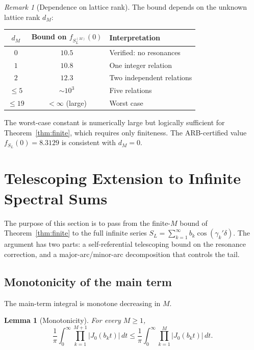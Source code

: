 \documentclass[12pt,reqno]{amsart}
\theoremstyle{plain}
\newtheorem{lemma}[theorem]{Lemma}
\theoremstyle{definition}
\theoremstyle{remark}
\newtheorem{remark}[theorem]{Remark}
\begin{document}
\begin{remark}[Dependence on lattice rank]\label{rem:rank}
The bound depends on the unknown lattice rank $d_M$:
\begin{center}
\renewcommand{\arraystretch}{1.1}
\begin{tabular}{ccl}
\toprule
$d_M$ & Bound on $f_{S_L^{(M)}}(0)$ & Interpretation \\
\midrule
$0$ & $10.5$ & Verified: no resonances \\
$1$ & $10.8$ & One integer relation \\
$2$ & $12.3$ & Two independent relations \\
$\leq 5$ & $\sim 10^3$ & Five relations \\
$\leq 19$ & $< \infty$ (large) & Worst case \\
\bottomrule
\end{tabular}
\end{center}
The worst-case constant is numerically large but logically sufficient for Theorem~\ref{thm:finite}, which requires only finiteness.  The ARB-certified value $f_{S_L}(0) = 8.3129$ is consistent with $d_M = 0$.
\end{remark}

\section{Telescoping Extension to Infinite Spectral Sums}\label{sec:infinite}

The purpose of this section is to pass from the finite-$M$ bound of Theorem~\ref{thm:finite} to the full infinite series $S_L = \sum_{k=1}^\infty b_k\cos(\gamma_k'\delta)$.  The argument has two parts: a self-referential telescoping bound on the resonance correction, and a major-arc/minor-arc decomposition that controls the tail.


\subsection{Monotonicity of the main term}

The main-term integral is monotone decreasing in $M$.

\begin{lemma}[Monotonicity]\label{lem:monotone}
For every $M \geq 1$,
\[
  \frac{1}{\pi}\int_0^\infty \prod_{k=1}^{M+1} |J_0(b_k t)|\, dt \leq \frac{1}{\pi}\int_0^\infty \prod_{k=1}^{M} |J_0(b_k t)|\, dt.
\]
\end{lemma}
\end{document}
